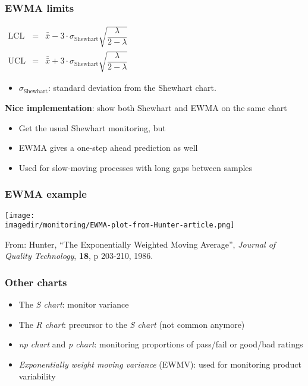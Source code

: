 \begin{frame}\frametitle{EWMA limits}
	
	$ 
	\begin{array}{rcl}
		\text{LCL} &=& \bar{\bar{x}} - 3 \cdot \sigma_{\text{Shewhart}}\sqrt{\dfrac{\lambda}{2-\lambda}} \\
		\text{UCL} &=& \bar{\bar{x}} + 3 \cdot \sigma_{\text{Shewhart}} \sqrt{\dfrac{\lambda}{2-\lambda}} 
	\end{array}
	$
	\begin{itemize}
		\item	$\sigma_{\text{Shewhart}}$: standard deviation from the Shewhart chart. 
	\end{itemize}
	
	\textbf{Nice implementation}: show both Shewhart and EWMA on the same chart 
	\begin{itemize}
		\item	Get the usual Shewhart monitoring, but 
		\item	EWMA gives a one-step ahead prediction as well 
		\item	Used for slow-moving processes with long gaps between samples 
	\end{itemize}
\end{frame}

\begin{frame}\frametitle{EWMA example}
	
	\texttt{[image: \\imagedir/monitoring/EWMA-plot-from-Hunter-article.png]}
	
	From: Hunter, ``The Exponentially Weighted Moving Average'', \emph{Journal of Quality Technology}, \textbf{18}, p 203-210, 1986.
\end{frame}

\begin{frame}\frametitle{Other charts}
	\begin{itemize}
		\item	The \emph{S chart}: monitor variance 
		\item	The \emph{R chart}: precursor to the \emph{S chart} (not common anymore) 
		\item	\emph{np chart} and \emph{p chart}: monitoring proportions of pass/fail or good/bad ratings 
		\item	\emph{Exponentially weight moving variance} (EWMV): used for monitoring product variability 
	\end{itemize}
\end{frame}

